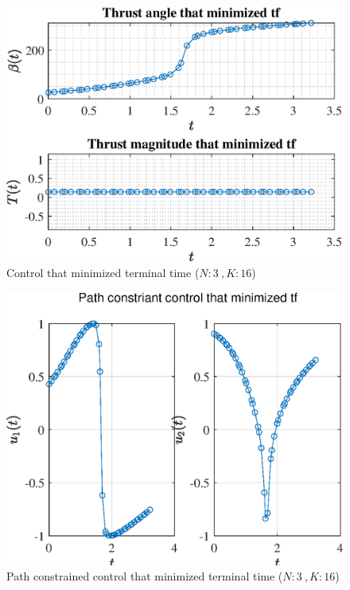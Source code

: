 \documentclass[]{article}
\begin{document}
	\begin{figure}
		\centering
		\includegraphics[scale=0.75]{control_N3_K16_C3_tf.eps}
		\caption{Control that minimized terminal time (\(N:3\ , K:16\))}
		\label{fig:control_N3_K16_C3_tf}
	\end{figure}
	\begin{figure}
		\centering
		\includegraphics[scale=0.75]{path_N3_K16_C3_tf.eps}
		\caption{Path constrained control that minimized terminal time (\(N:3\ , K:16\))}
		\label{fig:path_N3_K16_C3_tf}
	\end{figure}
\end{document}

